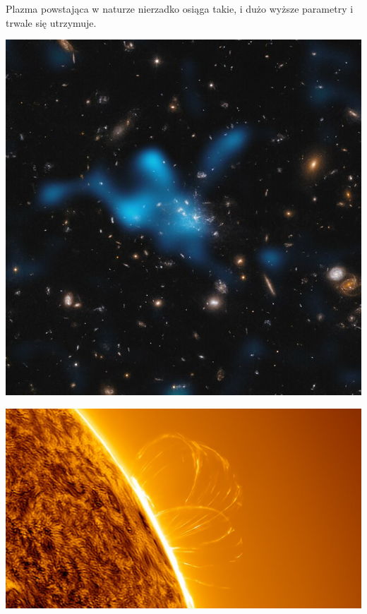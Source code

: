 \documentclass[10pt]{beamer}
\begin{document}
        \begin{frame}{Plazma powstająca w naturze nierzadko osiąga takie, i dużo wyższe parametry i trwale się utrzymuje.}
            \begin{minipage}{0.49\textwidth}
                \centering
                \includegraphics[width=0.8\linewidth]{intracluster.jpg}
            \end{minipage}
            \hfill
            \begin{minipage}{0.49\textwidth}
                \centering
                \includegraphics[width=0.8\linewidth]{star.jpg}
            \end{minipage}
        \end{frame}
\end{document}
